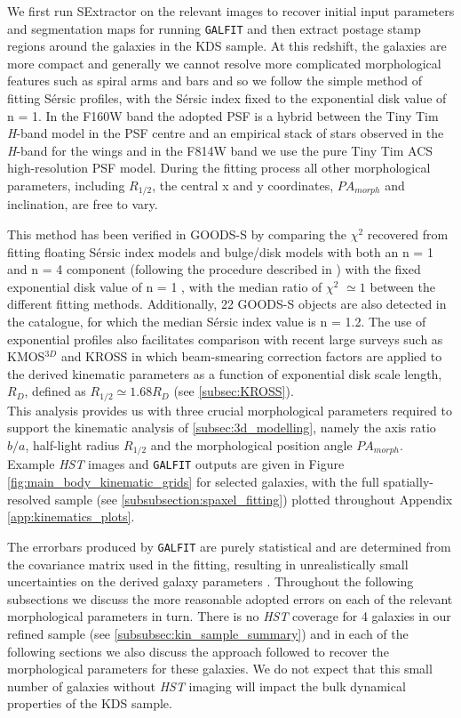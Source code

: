 \documentclass[fleqn,usenatbib]{mn2e}
\newcommand{\Sers}{S\'{e}rsic }
\begin{document}
We first run SExtractor \citep{Bertin1996} on the relevant images to recover initial input parameters and segmentation maps for running {\tt GALFIT} and then extract postage stamp regions around the galaxies in the KDS sample.
At this redshift, the galaxies are more compact and generally we cannot resolve more complicated morphological features such as spiral arms and bars and so we follow the simple method of fitting \Sers profiles, with the \Sers index fixed to the exponential disk value of n = 1.
In the F160W band the adopted PSF is a hybrid between the Tiny Tim {\it H}-band model \citep{Krist2011} in the PSF centre and an empirical stack of stars observed in the {\it H}-band for the wings \citep{VanderWel2012} and in the F814W band we use the pure Tiny Tim ACS high-resolution PSF model.
During the fitting process all other morphological parameters, including $R_{1/2}$, the central x and y coordinates, $PA_{morph}$ and inclination, are free to vary.

This method has been verified in GOODS-S by comparing the $\chi ^{2}$ recovered from fitting floating \Sers index models and bulge/disk models with both an n = 1 and n = 4 component (following the procedure described in \cite{Bruce2012}) with the fixed exponential disk value of n = 1 , with the median ratio of $\chi ^{2}$ $\simeq1$ between the different fitting methods. Additionally, 22 GOODS-S objects are also detected in the \cite{VanderWel2012} catalogue, for which the median \Sers index value is n = 1.2.
The use of exponential profiles also facilitates comparison with recent large surveys such as KMOS$^{3D}$ \citep{Wisnioski2015} and KROSS \citep{Harrison2017} in which beam-smearing correction factors are applied to the derived kinematic parameters as a function of exponential disk scale length, $R_{D}$, defined as $R_{1/2}\simeq1.68 R_{D}$ (see \cref{subsec:KROSS}). \\

This analysis provides us with three crucial morphological parameters required to support the kinematic analysis of \cref{subsec:3d_modelling}, namely the axis ratio $b/a$, half-light radius $R_{1/2}$ and the morphological position angle $PA_{morph}$.
Example {\em HST} images and {\tt GALFIT} outputs are given in Figure \ref{fig:main_body_kinematic_grids} for selected galaxies, with the full spatially-resolved sample (see \cref{subsubsection:spaxel_fitting}) plotted throughout Appendix \ref{app:kinematics_plots}. 

The errorbars produced by {\tt GALFIT} are purely statistical and are determined from the covariance matrix used in the fitting, resulting in unrealistically small uncertainties on the derived galaxy parameters \citep{Hausler2007,Bruce2012}.
Throughout the following subsections we discuss the more reasonable adopted errors on each of the relevant morphological parameters in turn.
There is no {\em HST} coverage for 4 galaxies in our refined sample (see \cref{subsubsec:kin_sample_summary}) and in each of the following sections we also discuss the approach followed to recover the morphological parameters for these galaxies.
We do not expect that this small number of galaxies without {\em HST} imaging will impact the bulk dynamical properties of the KDS sample.
\end{document}
